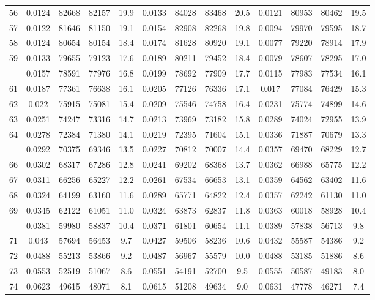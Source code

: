 \documentclass[
  14pt,
]{article}
\begin{document}
\begin{longtable}[t]{lcccccccccccc}
56 & 0.0124 & 82668 & 82157 & 19.9 & 0.0133 & 84028 & 83468 & 20.5 & 0.0121 & 80953 & 80462 & 19.5\\
57 & 0.0122 & 81646 & 81150 & 19.1 & 0.0154 & 82908 & 82268 & 19.8 & 0.0094 & 79970 & 79595 & 18.7\\
58 & 0.0124 & 80654 & 80154 & 18.4 & 0.0174 & 81628 & 80920 & 19.1 & 0.0077 & 79220 & 78914 & 17.9\\
59 & 0.0133 & 79655 & 79123 & 17.6 & 0.0189 & 80211 & 79452 & 18.4 & 0.0079 & 78607 & 78295 & 17.0\\
\addlinespace
60 & 0.0157 & 78591 & 77976 & 16.8 & 0.0199 & 78692 & 77909 & 17.7 & 0.0115 & 77983 & 77534 & 16.1\\
61 & 0.0187 & 77361 & 76638 & 16.1 & 0.0205 & 77126 & 76336 & 17.1 & 0.017 & 77084 & 76429 & 15.3\\
62 & 0.022 & 75915 & 75081 & 15.4 & 0.0209 & 75546 & 74758 & 16.4 & 0.0231 & 75774 & 74899 & 14.6\\
63 & 0.0251 & 74247 & 73316 & 14.7 & 0.0213 & 73969 & 73182 & 15.8 & 0.0289 & 74024 & 72955 & 13.9\\
64 & 0.0278 & 72384 & 71380 & 14.1 & 0.0219 & 72395 & 71604 & 15.1 & 0.0336 & 71887 & 70679 & 13.3\\
\addlinespace
65 & 0.0292 & 70375 & 69346 & 13.5 & 0.0227 & 70812 & 70007 & 14.4 & 0.0357 & 69470 & 68229 & 12.7\\
66 & 0.0302 & 68317 & 67286 & 12.8 & 0.0241 & 69202 & 68368 & 13.7 & 0.0362 & 66988 & 65775 & 12.2\\
67 & 0.0311 & 66256 & 65227 & 12.2 & 0.0261 & 67534 & 66653 & 13.1 & 0.0359 & 64562 & 63402 & 11.6\\
68 & 0.0324 & 64199 & 63160 & 11.6 & 0.0289 & 65771 & 64822 & 12.4 & 0.0357 & 62242 & 61130 & 11.0\\
69 & 0.0345 & 62122 & 61051 & 11.0 & 0.0324 & 63873 & 62837 & 11.8 & 0.0363 & 60018 & 58928 & 10.4\\
\addlinespace
70 & 0.0381 & 59980 & 58837 & 10.4 & 0.0371 & 61801 & 60654 & 11.1 & 0.0389 & 57838 & 56713 & 9.8\\
71 & 0.043 & 57694 & 56453 & 9.7 & 0.0427 & 59506 & 58236 & 10.6 & 0.0432 & 55587 & 54386 & 9.2\\
72 & 0.0488 & 55213 & 53866 & 9.2 & 0.0487 & 56967 & 55579 & 10.0 & 0.0488 & 53185 & 51886 & 8.6\\
73 & 0.0553 & 52519 & 51067 & 8.6 & 0.0551 & 54191 & 52700 & 9.5 & 0.0555 & 50587 & 49183 & 8.0\\
74 & 0.0623 & 49615 & 48071 & 8.1 & 0.0615 & 51208 & 49634 & 9.0 & 0.0631 & 47778 & 46271 & 7.4\\

\end{longtable}
\end{document}
